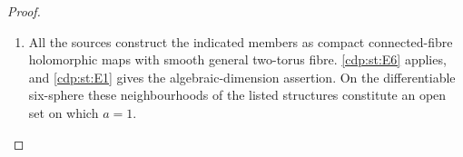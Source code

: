 \begin{proof}
\begin{enumerate}[label=\arabic*.,leftmargin=*]
\item All the sources construct the indicated members as compact
connected-fibre holomorphic maps with smooth general two-torus
fibre. \ref{cdp:st:E6} applies, and \ref{cdp:st:E1} gives the algebraic-dimension assertion.
On the differentiable six-sphere these neighbourhoods of the
listed structures constitute an open set on which $a=1$.

\end{enumerate}
\end{proof}